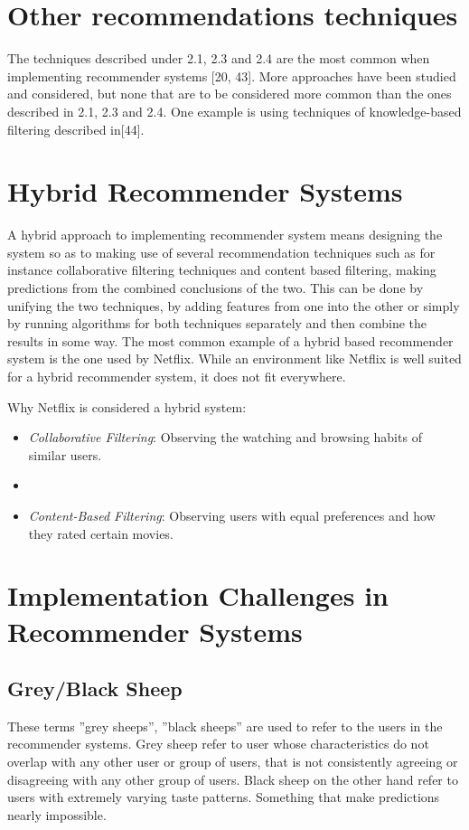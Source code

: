 \section{Other recommendations techniques}
The techniques described under 2.1, 2.3 and 2.4 are the most common when implementing recommender systems [20, 43]. More approaches have been studied and considered, but none that are to be considered more common than the ones described in 2.1, 2.3 and 2.4. One example is using techniques of knowledge-based filtering described in[44].

\section{Hybrid Recommender Systems}
A hybrid approach to implementing recommender system means designing the system so as to making use of several recommendation techniques such as for instance collaborative filtering techniques and content based filtering, making predictions from the combined conclusions of the two. This can be done by unifying the two techniques, by adding features from one into the other or simply by running algorithms for both techniques separately and then combine the results in some way. The most common example of a hybrid based recommender system is the one used by Netflix. While an environment like Netflix is well suited for a hybrid recommender system, it does not fit everywhere.

Why Netflix is considered a hybrid system:

\begin{itemize}
	\item {\textit{Collaborative Filtering}: Observing the watching and browsing habits of similar users.}
\item \blindtext
\item {\textit{Content-Based Filtering}: Observing users with equal preferences and how they rated certain movies.}

\end{itemize}

\section{Implementation Challenges in Recommender Systems}

\subsection{Grey/Black Sheep}
These terms ”grey sheeps”, ”black sheeps” are used to refer to the users in the recommender systems. Grey sheep refer to user whose characteristics do not overlap with any other user or group of users, that is not consistently agreeing or disagreeing with any other group of users. Black sheep on the other hand refer to users with extremely varying taste patterns. Something that make predictions nearly impossible.






